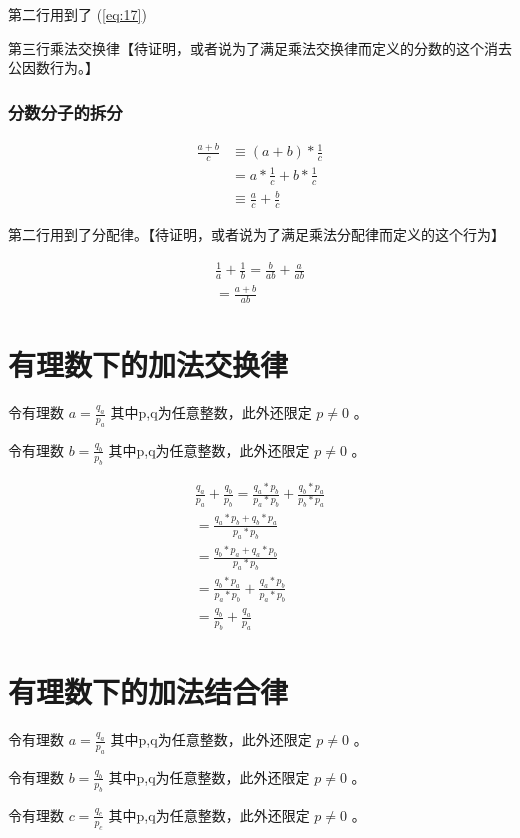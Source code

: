 \documentclass[12pt,oneside]{book}
\begin{document}
第二行用到了 (\ref{eq:17})

第三行乘法交换律【待证明，或者说为了满足乘法交换律而定义的分数的这个消去公因数行为。】

\subsubsection{分数分子的拆分}
\begin{align*}
\frac{a+b}{c} &\equiv (a+b) * \frac{1}{c}\\
&=a* \frac{1}{c} + b* \frac{1}{c}\\
&\equiv \frac{a}{c} + \frac{b}{c}
\end{align*}

第二行用到了分配律。【待证明，或者说为了满足乘法分配律而定义的这个行为】

\begin{align*}
\frac{1}{a} + \frac{1}{b} = \frac{b}{ab} + \frac{a}{ab}\\
= \frac{a+b}{ab}
\end{align*}


\section{有理数下的加法交换律}
令有理数 $a = \frac{q_a}{p_a}$ 其中p,q为任意整数，此外还限定 $p \neq 0$ 。

令有理数 $b = \frac{q_b}{p_b}$ 其中p,q为任意整数，此外还限定 $p \neq 0$ 。


\begin{align*}
\frac{q_a}{p_a} + \frac{q_b}{p_b} = \frac{q_a *p_b}{p_a * p_b} + \frac{q_b * p_a}{p_b * p_a}\\
= \frac{q_a * p_b + q_b * p_a}{p_a * p_b} \\
= \frac{q_b * p_a + q_a * p_b}{p_a * p_b} \\
= \frac{q_b*p_a}{p_a*p_b} + \frac{q_a * p_b}{p_a * p_b}\\
= \frac{q_b}{p_b} + \frac{q_a}{p_a}
\end{align*}


\section{有理数下的加法结合律}
令有理数 $a = \frac{q_a}{p_a}$ 其中p,q为任意整数，此外还限定 $p \neq 0$ 。

令有理数 $b = \frac{q_b}{p_b}$ 其中p,q为任意整数，此外还限定 $p \neq 0$ 。

令有理数 $c = \frac{q_c}{p_c}$ 其中p,q为任意整数，此外还限定 $p \neq 0$ 。
\end{document}
